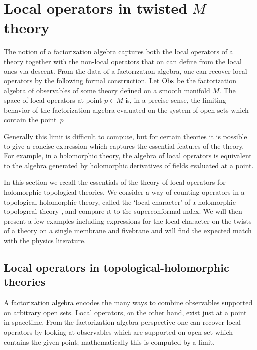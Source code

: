 %
%
%

\section{Local operators in twisted $M$ theory}

The notion of a factorization algebra captures both the local operators of a theory together with the non-local operators that on can define from the local ones via descent.
From the data of a factorization algebra, one can recover local operators by the following formal construction. 
Let $\operatorname{Obs}$ be the factorization algebra of observables of some theory defined on a smooth manifold $M$.
The space of local operators at point $p \in M$ is, in a precise sense, the limiting behavior of the factorization algebra evaluated on the system of open sets which contain the point~$p$. 

Generally this limit is difficult to compute, but for certain theories it is possible to give a concise expression which captures the essential features of the theory.
For example, in a holomorphic theory, the algebra of local operators is equivalent to the algebra generated by holomorphic derivatives of fields evaluated at a point.

In this section we recall the essentials of the theory of local operators for holomorphic-topological theories. 
We consider a way of counting operators in a topological-holomorphic theory, called the `local character' of a holomorphic-topological theory \cite{SWchar}, and compare it to the superconformal index.
We will then present a few examples including expressions for the local character on the twists of a theory on a single membrane and fivebrane and will find the expected match with the physics literature.

\subsection{Local operators in topological-holomorphic theories}

A factorization algebra encodes the many ways to combine observables supported on arbitrary open sets. 
Local operators, on the other hand, exist just at a point in spacetime.
From the factorization algebra perspective one can recover local operators by looking at observables which are supported on  open set which contains the given point; mathematically this is computed by a limit. 

